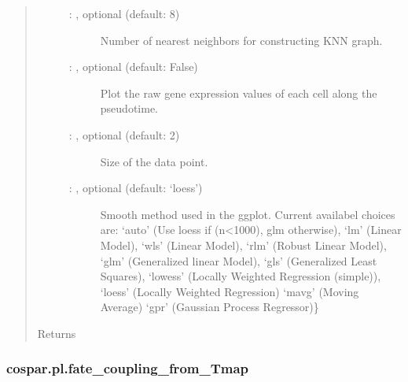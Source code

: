 \documentclass[letterpaper,10pt,english]{sphinxmanual}
\begin{document}
\begin{fulllineitems}
\begin{quote}
\begin{description}
\begin{description}
\item[{ : , optional (default: 8)}] \leavevmode
Number of nearest neighbors for constructing KNN graph.

\item[{ : , optional (default: False)}] \leavevmode
Plot the raw gene expression values of each cell along the pseudotime.

\item[{ : , optional (default: 2)}] \leavevmode
Size of the data point.

\item[{ : , optional (default: ‘loess’)}] \leavevmode
Smooth method used in the ggplot. Current availabel choices are:
‘auto’ (Use loess if (n\textless{}1000), glm otherwise),
‘lm’ (Linear Model),
‘wls’ (Linear Model),
‘rlm’ (Robust Linear Model),
‘glm’ (Generalized linear Model),
‘gls’ (Generalized Least Squares),
‘lowess’ (Locally Weighted Regression (simple)),
‘loess’ (Locally Weighted Regression)
‘mavg’ (Moving Average)
‘gpr’ (Gaussian Process Regressor)\}

\end{description}

\item[{Returns}] \leavevmode
{}

\end{description}\end{quote}

\end{fulllineitems}



\subsubsection{cospar.pl.fate\_coupling\_from\_Tmap}
\label{\detokenize{cospar.pl.fate_coupling_from_Tmap:cospar-pl-fate-coupling-from-tmap}}\label{\detokenize{cospar.pl.fate_coupling_from_Tmap::doc}}
\end{document}
